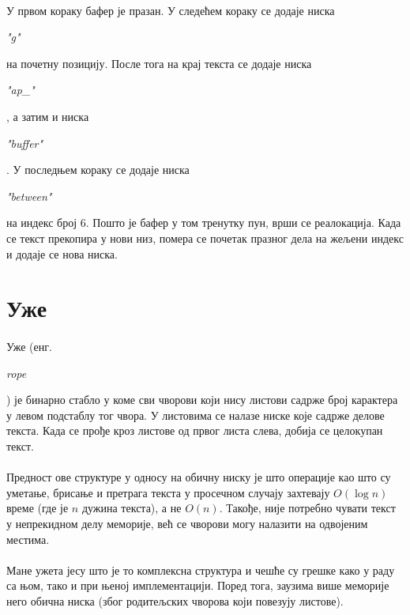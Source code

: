 \documentclass[12pt,oneside]{memoir}
\begin{document}
\paragraph{}
У првом кораку бафер је празан. У следећем кораку се додаје ниска \begin{latinica}\textit{"g"}\end{latinica} на почетну позицију. После тога на крај текста
се додаје ниска \begin{latinica}\textit{"ap\_"}\end{latinica}, а затим и ниска
\begin{latinica}\textit{"buffer"}\end{latinica}. У последњем кораку се додаје ниска
\begin{latinica}\textit{"between"}\end{latinica} на индекс број 6. Пошто је бафер  
у том тренутку пун, врши се реалокација. Када се текст прекопира у нови низ, 
помера се почетак празног дела на жељени индекс и додаје се нова ниска.

\section{Уже}
\paragraph{}
Уже (енг. \begin{latinica}\textit{rope}\end{latinica}) је бинарно стабло у коме сви чворови који нису
листови садрже број карактера у левом подстаблу тог чвора. У листовима се налазе ниске које 
садрже делове текста. Када се прође кроз листове од првог листа слева, добија се целокупан
текст.

\paragraph{}
Предност ове структуре у односу на обичну ниску је што операције као што су уметање, брисање
и претрага текста у просечном случају захтевају \(O(\log{}n)\) време (где је \(n\) дужина текста), 
а не \(O(n)\). Такође, није потребно чувати текст у непрекидном делу меморије, већ се чворови могу налазити на одвојеним местима.

\paragraph{}
Мане ужета јесу што је то комплексна структура и чешће су грешке како у раду са њом, тако и при
њеној имплементацији. Поред тога, заузима више меморије него обична ниска 
(због родитељских чворова који повезују листове).
\end{document}
